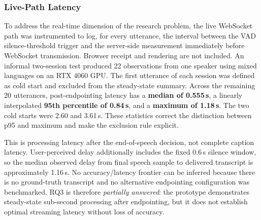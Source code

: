 \documentclass[12pt]{report}
\begin{document}
\subsubsection{Live-Path Latency}
To address the real-time dimension of the research problem, the live WebSocket path was instrumented to log, for every utterance, the interval between the VAD silence-threshold trigger and the server-side measurement immediately before WebSocket transmission. Browser receipt and rendering are not included. An informal two-session test produced 22 observations from one speaker using mixed languages on an RTX 4060 GPU. The first utterance of each session was defined as cold start and excluded from the steady-state summary. Across the remaining 20 utterances, post-endpointing latency has a \textbf{median of 0.555\,s}, a linearly interpolated \textbf{95th percentile of 0.84\,s}, and a \textbf{maximum of 1.18\,s}. The two cold starts were 2.60 and 3.61\,s. These statistics correct the distinction between p95 and maximum and make the exclusion rule explicit.

This is processing latency after the end-of-speech decision, not complete caption latency. User-perceived delay additionally includes the fixed 0.6\,s silence window, so the median observed delay from final speech sample to delivered transcript is approximately 1.16\,s. No accuracy/latency frontier can be inferred because there is no ground-truth transcript and no alternative endpointing configuration was benchmarked. RQ3 is therefore \emph{partially answered}: the prototype demonstrates steady-state sub-second processing after endpointing, but it does not establish optimal streaming latency without loss of accuracy.
\end{document}
